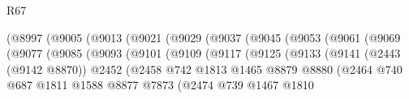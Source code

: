 \begin{lexlean}{R67}
\begin{coremodule}
                                (@8997
                                  (@9005
                                    (@9013
                                      (@9021
                                        (@9029
                                          (@9037
                                            (@9045
                                              (@9053
                                                (@9061
                                                  (@9069
                                                    (@9077
                                                      (@9085
                                                        (@9093
                                                          (@9101
                                                            (@9109
                                                              (@9117
                                                                (@9125
                                                                  (@9133
                                                                    (@9141
                                                                      (@2443 (@9142 @8870))
                                                                      @2452
                                                                      (@2458
                                                                        @742
                                                                        @1813
                                                                        @1465
                                                                        @8879
                                                                        @8880
                                                                        (@2464
                                                                          @740
                                                                          @687
                                                                          @1811
                                                                          @1588
                                                                          @8877
                                                                          @7873
                                                                          (@2474
                                                                            @739
                                                                            @1467
                                                                            @1810

\end{coremodule}
\end{lexlean}
